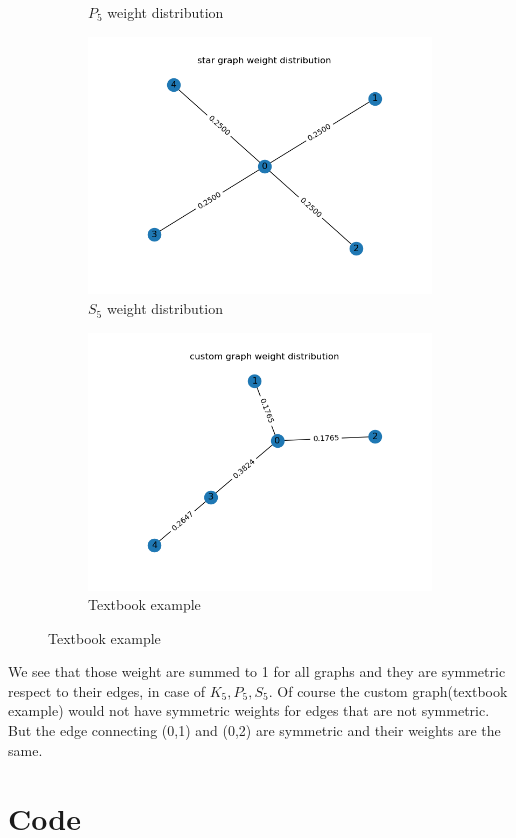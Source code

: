 \documentclass{article}
\begin{document}
\begin{problem}
\begin{figure}[!h]
\begin{subfigure}{0.45\textwidth}
            \caption{$P_5$ weight distribution}
        \end{subfigure}
        \begin{subfigure}{0.45\textwidth}
            \includegraphics[width=\textwidth]{./img/p5_star.png}
            \caption{$S_5$ weight distribution}
        \end{subfigure}
        \begin{subfigure}{0.45\textwidth}
            \includegraphics[width=\textwidth]{./img/p5_textbook.png}
            \caption{Textbook example }
        \end{subfigure}
    \end{figure}
    
    We see that those weight are summed to 1 for all graphs and they are symmetric respect to their edges, in case of $K_5, P_5, S_5$. Of course the custom graph(textbook example) would not have symmetric weights for edges that are not symmetric. But the edge connecting (0,1) and (0,2) are symmetric and their weights are the same.
\end{problem}
\newpage
\section*{Code}
\begin{verbatim}
\end{verbatim}
\end{document}
